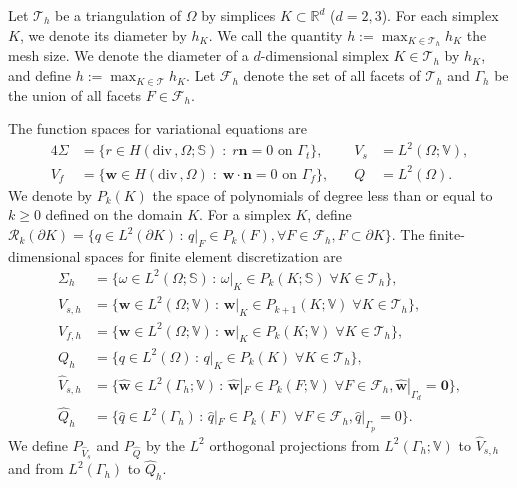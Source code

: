 \documentclass[10pt,letterpaper]{amsart}
\theoremstyle{plain} %
\theoremstyle{remark} %
\newcommand{\vect}[1]{\mathbf{#1}}
\newcommand{\divergence}{\mathrm{div}\,}
\newcommand{\Rn}{\mathbb{V}} %
\newcommand{\Rsym}{\mathbb{S}} %
\newcommand{\Th}{\mathcal{T}_h} %
\begin{document}
Let $\mathcal{T}_{h}$ be a triangulation of $\Omega$ by simplices $K\subset \mathbb{R}^d$ ($d=2,3$). For each simplex $K$, we denote its diameter by $h_K$. We call the quantity $h:=\max_{K\in\Th}h_K$ the mesh size. We denote the diameter of a $d$-dimensional simplex $K \in \mathcal{T}_h$ by $h_K$, and define
$h:=\max_{K\in \mathcal{T}} h_K$. Let $\mathcal{F}_{h}$ denote the set of all facets of $\mathcal{T}_h$ and $\Gamma_{h}$ be the union of all facets $F \in \mathcal{F}_{h}$. 

The function spaces for variational equations are 
%
\begin{alignat*}{4}
	\Sigma &= \{ r \in H(\divergence, \Omega;\Rsym)\;:\; r\vect{n} = 0\text{ on }\Gamma_t \}, &\quad V_{s}&= L^{2}(\Omega;\Rn),  
	\\
	V_{f}  &= \{\vect{w}\in H(\divergence, \Omega)\;:\;\vect{w}\cdot\vect{n} = 0 \text{ on }\Gamma_{f}\}, &\quad Q&= L^{2}(\Omega).
\end{alignat*}
%
We denote by ${P}_k(K)$ the space of polynomials of degree less than or equal to $k\ge0$ defined on the domain $K$. For a simplex $K$, define $\mathcal{R}_k(\partial K) = \{q \in L^2(\partial K) \,: \, q|_F \in P_k(F), \forall F \in \mathcal{F}_h, F \subset \partial K\}$.  The finite-dimensional spaces for finite element discretization are
%
\begin{subequations}
	\label{eq:HDGspaces}
	\begin{align}
		\Sigma_{h} &= \{ \omega \in L^2(\Omega; \mathbb{S})\,:\, \omega|_{K} \in P_{k}(K; \mathbb{S}) \; \forall K \in \mathcal{T}_h \}, 
		\\
		V_{s,h} &= \{ \vect{w} \in L^2(\Omega; \mathbb{V})\,:\, \vect{w}|_{K} \in P_{k+1}(K; \mathbb{V})  \; \forall K \in \mathcal{T}_h\}, 
		\\
		V_{f,h} &= \{ \vect{w} \in L^2(\Omega; \mathbb{V})\,:\, \vect{w}|_{K} \in P_{k}(K; \mathbb{V})  \; \forall K \in \mathcal{T}_h\}, 
		\\
		Q_{h} &= \{ q \in L^2(\Omega)\,:\, q|_{K} \in P_{k}(K)  \; \forall K \in \mathcal{T}_h\}, 
		\\
		\widehat{V}_{s,h} &= \{ \widehat{\vect{w}} \in L^2(\Gamma_h; \mathbb{V})\,:\, \widehat{\vect{w}}|_{F} \in P_{k}(F; \mathbb{V})  \; \forall F \in \mathcal{F}_h, \widehat{\vect{w}}|_{\Gamma_d} = \vect{0} \}, 
		\\
		\widehat{Q}_{h} &= \{ \widehat{q} \in L^2(\Gamma_h)\,:\, \widehat{q}|_{F} \in P_{k}(F)  \; \forall F \in \mathcal{F}_h, \widehat{q}|_{\Gamma_p} = 0\} .
	\end{align}
\end{subequations}
%
We define $P_{\widehat{V}_s}$ and $P_{\widehat{Q}}$ by the $L^2$ orthogonal projections from $L^2(\Gamma_{h}; \mathbb{V})$ to $\widehat{V}_{s,h}$ and from $L^2(\Gamma_{h})$ to $\widehat{Q}_{h}$. 
\end{document}
